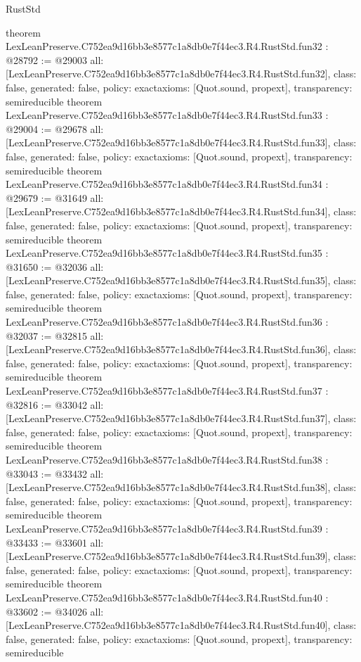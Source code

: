 \begin{lexlean}{RustStd}
\begin{coremodule}
{}
theorem LexLeanPreserve.C752ea9d16bb3e8577c1a8db0e7f44ec3.R4.RustStd.fun32 : @28792 := @29003 {
  all: [LexLeanPreserve.C752ea9d16bb3e8577c1a8db0e7f44ec3.R4.RustStd.fun32],
  class: false,
  generated: false,
  policy: exact{axioms: [Quot.sound, propext]},
  transparency: semireducible
}
theorem LexLeanPreserve.C752ea9d16bb3e8577c1a8db0e7f44ec3.R4.RustStd.fun33 : @29004 := @29678 {
  all: [LexLeanPreserve.C752ea9d16bb3e8577c1a8db0e7f44ec3.R4.RustStd.fun33],
  class: false,
  generated: false,
  policy: exact{axioms: [Quot.sound, propext]},
  transparency: semireducible
}
theorem LexLeanPreserve.C752ea9d16bb3e8577c1a8db0e7f44ec3.R4.RustStd.fun34 : @29679 := @31649 {
  all: [LexLeanPreserve.C752ea9d16bb3e8577c1a8db0e7f44ec3.R4.RustStd.fun34],
  class: false,
  generated: false,
  policy: exact{axioms: [Quot.sound, propext]},
  transparency: semireducible
}
theorem LexLeanPreserve.C752ea9d16bb3e8577c1a8db0e7f44ec3.R4.RustStd.fun35 : @31650 := @32036 {
  all: [LexLeanPreserve.C752ea9d16bb3e8577c1a8db0e7f44ec3.R4.RustStd.fun35],
  class: false,
  generated: false,
  policy: exact{axioms: [Quot.sound, propext]},
  transparency: semireducible
}
theorem LexLeanPreserve.C752ea9d16bb3e8577c1a8db0e7f44ec3.R4.RustStd.fun36 : @32037 := @32815 {
  all: [LexLeanPreserve.C752ea9d16bb3e8577c1a8db0e7f44ec3.R4.RustStd.fun36],
  class: false,
  generated: false,
  policy: exact{axioms: [Quot.sound, propext]},
  transparency: semireducible
}
theorem LexLeanPreserve.C752ea9d16bb3e8577c1a8db0e7f44ec3.R4.RustStd.fun37 : @32816 := @33042 {
  all: [LexLeanPreserve.C752ea9d16bb3e8577c1a8db0e7f44ec3.R4.RustStd.fun37],
  class: false,
  generated: false,
  policy: exact{axioms: [Quot.sound, propext]},
  transparency: semireducible
}
theorem LexLeanPreserve.C752ea9d16bb3e8577c1a8db0e7f44ec3.R4.RustStd.fun38 : @33043 := @33432 {
  all: [LexLeanPreserve.C752ea9d16bb3e8577c1a8db0e7f44ec3.R4.RustStd.fun38],
  class: false,
  generated: false,
  policy: exact{axioms: [Quot.sound, propext]},
  transparency: semireducible
}
theorem LexLeanPreserve.C752ea9d16bb3e8577c1a8db0e7f44ec3.R4.RustStd.fun39 : @33433 := @33601 {
  all: [LexLeanPreserve.C752ea9d16bb3e8577c1a8db0e7f44ec3.R4.RustStd.fun39],
  class: false,
  generated: false,
  policy: exact{axioms: [Quot.sound, propext]},
  transparency: semireducible
}
theorem LexLeanPreserve.C752ea9d16bb3e8577c1a8db0e7f44ec3.R4.RustStd.fun40 : @33602 := @34026 {
  all: [LexLeanPreserve.C752ea9d16bb3e8577c1a8db0e7f44ec3.R4.RustStd.fun40],
  class: false,
  generated: false,
  policy: exact{axioms: [Quot.sound, propext]},
  transparency: semireducible
}
\end{coremodule}
\end{lexlean}
